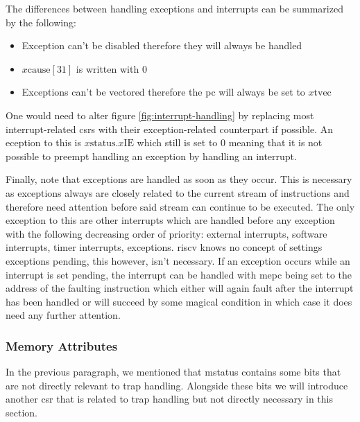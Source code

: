The differences between handling exceptions and interrupts can be summarized by the following:
\begin{itemize}
    \item Exception can't be disabled therefore they will always be handled
    \item $ x\text{cause}[31] $ is written with $ 0 $
    \item Exceptions can't be vectored therefore the \gls{pc} will always be set to $ x\text{tvec} $
\end{itemize}

One would need to alter figure \ref{fig:interrupt-handling} by replacing most interrupt-related \glspl{csr} with their exception-related counterpart if possible.
An eception to this is $ x\text{status}.x\text{IE} $ which still is set to 0 meaning that it is not possible to preempt handling an exception by handling an interrupt.

Finally, note that exceptions are handled as soon as they occur.
This is necessary as exceptions always are closely related to the current stream of instructions and therefore need attention before said stream can continue to be executed.
The only exception to this are other interrupts which are handled before any exception with the following decreasing order of priority: external interrupts, software interrupts, timer interrupts, exceptions.
\gls{riscv} knows no concept of settings exceptions pending, this however, isn't necessary.
If an exception occurs while an interrupt is set pending, the interrupt can be handled with \gls{mepc} being set to the address of the faulting instruction which either will again fault after the interrupt has been handled or will succeed by some magical condition in which case it does need any further attention.


\subsubsection{Memory Attributes}

In the previous paragraph, we mentioned that \gls{mstatus} contains some bits that are not directly relevant to trap handling.
Alongside these bits we will introduce another \gls{csr} that is related to trap handling but not directly necessary in this section.

